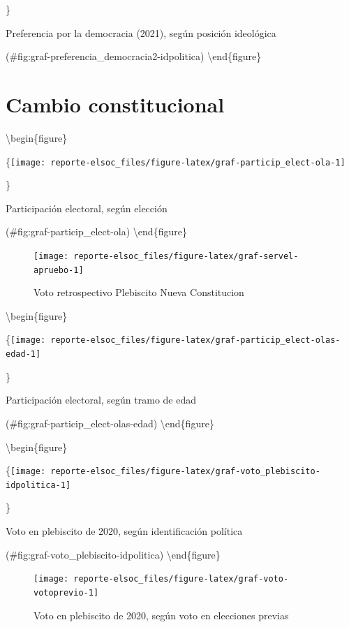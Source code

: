\documentclass[
  12pt,
]{book}
\begin{document}
\}

\caption{Preferencia por la democracia (2021), según posición ideológica}

(\#fig:graf-preferencia\_democracia2-idpolitica)
\textbackslash end\{figure\}

\hypertarget{cambio-constitucional}{%
\section{Cambio constitucional}\label{cambio-constitucional}}

\textbackslash begin\{figure\}

\{\centering \texttt{[image: reporte-elsoc\_files/figure-latex/graf-particip\_elect-ola-1]}

\}

\caption{Participación electoral, según elección}

(\#fig:graf-particip\_elect-ola)
\textbackslash end\{figure\}

\begin{figure}

{\centering \texttt{[image: reporte-elsoc\_files/figure-latex/graf-servel-apruebo-1]} 

}

\caption{Voto retrospectivo Plebiscito Nueva Constitucion}\label{fig:graf-servel-apruebo}
\end{figure}

\textbackslash begin\{figure\}

\{\centering \texttt{[image: reporte-elsoc\_files/figure-latex/graf-particip\_elect-olas-edad-1]}

\}

\caption{Participación electoral, según tramo de edad}

(\#fig:graf-particip\_elect-olas-edad)
\textbackslash end\{figure\}

\textbackslash begin\{figure\}

\{\centering \texttt{[image: reporte-elsoc\_files/figure-latex/graf-voto\_plebiscito-idpolitica-1]}

\}

\caption{Voto en plebiscito de 2020, según identificación política}

(\#fig:graf-voto\_plebiscito-idpolitica)
\textbackslash end\{figure\}

\begin{figure}

{\centering \texttt{[image: reporte-elsoc\_files/figure-latex/graf-voto-votoprevio-1]} 

}

\caption{Voto en plebiscito de 2020, según voto en elecciones previas}\label{fig:graf-voto-votoprevio}
\end{figure}
\end{document}
